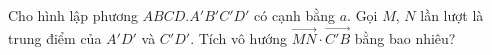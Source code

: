 \begin{ex}
Cho hình lập phương $ABCD.A'B'C'D'$ có cạnh bằng $a$. Gọi $M$, $N$ lần lượt là trung điểm của $A'D'$ và $C'D'$. Tích vô hướng $\overrightarrow{MN}\cdot\overrightarrow{C'B}$ bằng bao nhiêu?
\end{ex}
